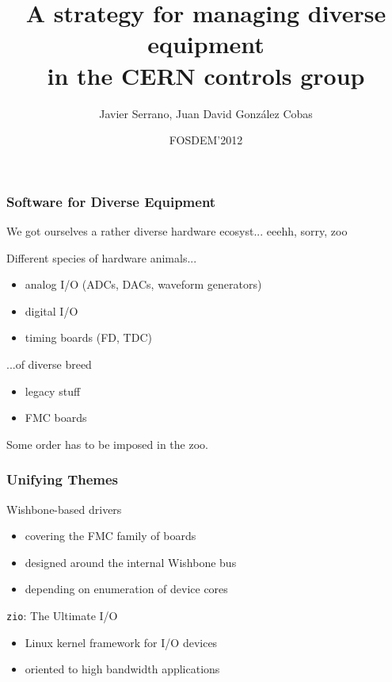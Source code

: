 \documentclass[compress,red]{beamer}
\title[Managing equipment at CERN]%
	{A strategy for managing diverse equipment\\
	in the CERN controls group}
\author[Javier Serrano, David Cobas et al.]{%
	Javier Serrano, Juan David Gonz\'alez Cobas}
\date{FOSDEM'2012}
\begin{document}
\begin{frame}
\titlepage
\end{frame}

\begin{frame}
\frametitle{Software for Diverse Equipment}

We got ourselves a rather diverse hardware ecosyst...
\pause eeehh, sorry, \pause zoo
\pause
\begin{block}{Different species of hardware animals...}
\begin{itemize}
\pause\item analog I/O (ADCs, DACs, waveform generators)
\pause\item digital I/O
\pause\item timing boards (FD, TDC)
\end{itemize}
\end{block}
\pause
\begin{block}{...of diverse breed}
\begin{itemize}
\pause\item legacy stuff
\pause\item FMC boards
\end{itemize}
\end{block}

\pause Some order has to be imposed in the zoo.
\end{frame}

\begin{frame}
\frametitle{Unifying Themes}
\begin{block}{Wishbone-based drivers}
\begin{itemize}
\item covering the FMC family of boards
\item designed around the internal Wishbone bus
\item depending on enumeration of device cores
\end{itemize}
\end{block}
\begin{block}{\texttt{zio}: The Ultimate I/O}
\begin{itemize}
\item Linux kernel framework for I/O devices
\item oriented to high bandwidth applications
\end{itemize}
\end{block}


\end{frame}
\end{document}
